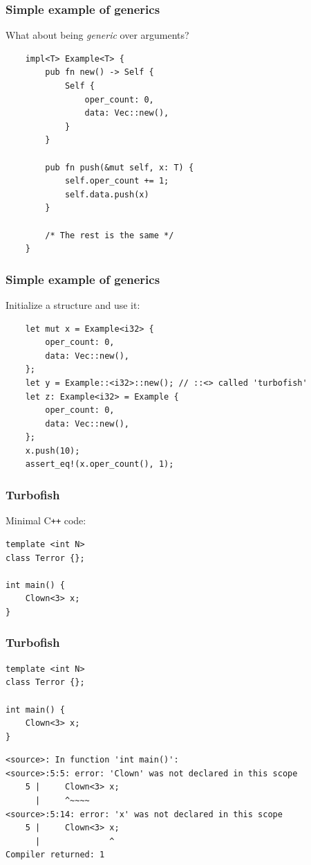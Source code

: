 \documentclass[aspectratio=1610,t]{beamer}
\begin{document}

\begin{frame}[fragile]
\frametitle{Simple example of generics}
What about being \textit{generic} over arguments?

\begin{verbatim}
    impl<T> Example<T> {
        pub fn new() -> Self {
            Self {
                oper_count: 0,
                data: Vec::new(),
            }
        }

        pub fn push(&mut self, x: T) {
            self.oper_count += 1;
            self.data.push(x)
        }

        /* The rest is the same */
    } 
\end{verbatim}
\end{frame}


\begin{frame}[fragile]
\frametitle{Simple example of generics}
Initialize a structure and use it:

\begin{verbatim}
    let mut x = Example<i32> {
        oper_count: 0,
        data: Vec::new(),
    };
    let y = Example::<i32>::new(); // ::<> called 'turbofish'
    let z: Example<i32> = Example {
        oper_count: 0,
        data: Vec::new(),
    };
    x.push(10);
    assert_eq!(x.oper_count(), 1);
\end{verbatim}
\end{frame}


\begin{frame}[fragile]
\frametitle{Turbofish}
Minimal C\texttt{++} code:
\begin{verbatim}
template <int N>
class Terror {};

int main() {
    Clown<3> x;
}
\end{verbatim}
\end{frame}


\begin{frame}[fragile]
\frametitle{Turbofish}
\begin{verbatim}
template <int N>
class Terror {};

int main() {
    Clown<3> x;
}
\end{verbatim}

\begin{verbatim}
<source>: In function 'int main()':
<source>:5:5: error: 'Clown' was not declared in this scope
    5 |     Clown<3> x;
      |     ^~~~~
<source>:5:14: error: 'x' was not declared in this scope
    5 |     Clown<3> x;
      |              ^
Compiler returned: 1
\end{verbatim}

\end{frame}
\end{document}
